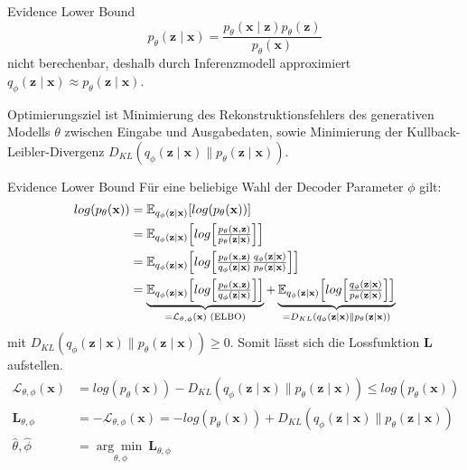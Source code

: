 \begin{frame}{Evidence Lower Bound}
  \begin{equation*}
    p_\theta (\mathbf{z\mid x}) = \frac{p_\theta (\mathbf{x\mid z}) p_\theta (\mathbf{z})}{p_\theta(\mathbf{x})}
\end{equation*} nicht berechenbar, deshalb durch Inferenzmodell approximiert $q_\phi (\mathbf{z\mid x}) \approx p_\theta (\mathbf{z\mid x})$.

Optimierungsziel ist Minimierung des Rekonstruktionsfehlers des generativen Modells $\theta$ zwischen Eingabe und Ausgabedaten, sowie Minimierung der Kullback-Leibler-Divergenz  $D_{KL}(q_\phi(\mathbf{z\mid x})\parallel p_\theta(\mathbf{z\mid x}))$.


\end{frame}

\begin{frame}{Evidence Lower Bound}
  Für eine beliebige Wahl der Decoder Parameter $\phi$ gilt:
  \begin{align*}
    log(p_\theta(\mathbf{x})) &= \mathbb{E}_{ q_\phi(\mathbf{z\mid x}) } [log( p_\theta(\mathbf{x}) )] \nonumber \\
    &= \mathbb{E}_{q_\phi( \mathbf{z\mid x} )} \Bigl[ log \Bigl[ \tfrac{ p_\theta(\mathbf{x,z}) }{ p_\theta(\mathbf{z \mid x}) } \Bigr] \Bigr] \nonumber \\
    &= \mathbb{E}_{q_\phi( \mathbf{z\mid x} )} \Bigl[ log \Bigl[ \tfrac{ p_\theta(\mathbf{x,z}) }{ q_\phi( \mathbf{z\mid x} ) } \tfrac{ q_\phi( \mathbf{z\mid x} ) }{ p_\theta(\mathbf{z \mid x}) }\Bigr] \Bigr] \nonumber \\
    &= \underbrace{\mathbb{E}_{q_\phi( \mathbf{z\mid x} )} \Bigl[ log \Bigl[ \tfrac{ p_\theta(\mathbf{x,z}) }{ q_\phi( \mathbf{z\mid x} ) } \Bigr] \Bigr]}_{=\mathcal{L}_{\theta,\phi}(\mathbf{x}) \text{ (ELBO)}} + \underbrace{\mathbb{E}_{q_\phi( \mathbf{z\mid x} )} \Bigl[ log \Bigl[ \tfrac{ q_\phi( \mathbf{z\mid x} ) }{ p_\theta(\mathbf{z \mid x}) }\Bigr] \Bigr]}_{=D_{KL}(q_\phi(\mathbf{z\mid x})\parallel p_\theta(\mathbf{z\mid x}))} 
  \end{align*}
  mit $D_{KL}(q_\phi(\mathbf{z\mid x})\parallel p_\theta(\mathbf{z\mid x})) \geq 0$. Somit lässt sich die Lossfunktion $\mathbf{L}$ aufstellen.
  \begin{align*}
    \mathcal{L}_{\theta,\phi}(\mathbf{x}) &= log(p_\theta(\mathbf{x})) - D_{KL}(q_\phi(\mathbf{z\mid x})\parallel p_\theta(\mathbf{z\mid x})) \leq log(p_\theta(\mathbf{x})) \\
\mathbf{L}_{\theta,\phi} &= -\mathcal{L}_{\theta,\phi}(\mathbf{x}) = -log(p_\theta(\mathbf{x})) + D_{KL}(q_\phi(\mathbf{z\mid x})\parallel p_\theta(\mathbf{z\mid x}))  \\
    \hat{\theta},\hat{\phi} &= \underset{\theta, \phi}{\arg\min \ } \mathbf{L}_{\theta,\phi}
\end{align*}
\end{frame}

